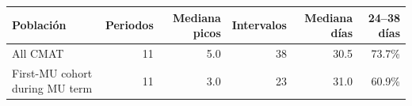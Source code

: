 \begin{tabular}{lrrrrr}
\toprule
Población & Periodos & Mediana picos & Intervalos & Mediana días & 24--38 días \\
\midrule
All CMAT & 11 & 5.0 & 38 & 30.5 & 73.7\% \\
First-MU cohort during MU term & 11 & 3.0 & 23 & 31.0 & 60.9\% \\
\bottomrule
\end{tabular}
